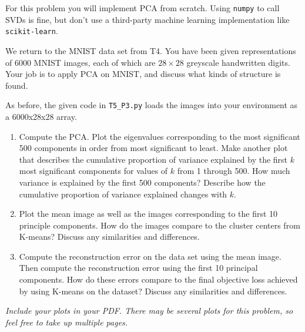 \documentclass[submit]{harvardml}
\begin{document}
\newpage

\begin{problem}

For this problem you will implement PCA from scratch.  Using
\texttt{numpy} to call SVDs is fine, but don't use a third-party
machine learning implementation like \texttt{scikit-learn}.

We return to the MNIST data set from T4. You have been given
representations of 6000 MNIST images, each of which are $28\times28$
greyscale handwritten digits. Your job is to apply PCA on MNIST, and
discuss what kinds of structure is found.

As before, the given code in \texttt{T5\_P3.py} loads the images into your environment as a
6000x28x28 array.

\begin{enumerate}

\item Compute the PCA. Plot the eigenvalues corresponding to the most significant 500
  components in order from most significant to least. Make another plot that describes the cumulative proportion of variance explained by the first $k$ most significant components for values of $k$ from 1 through 500.
  How much variance is explained by the first 500 components?  Describe
  how the cumulative proportion of variance explained changes with $k$.

\item Plot the mean image as well as the images corresponding to the
  first 10 principle components.  How do the images compare to the
  cluster centers from K-means? Discuss any similarities and
  differences.

\item Compute the reconstruction error on the data set using the mean
  image. Then compute the reconstruction error using the first 10 principal components. How do these
  errors compare to the final objective loss achieved by using K-means on the dataset? Discuss any similarities and
  differences.

\end{enumerate}


\textit{Include your plots in your PDF. There may be several plots for this problem, so feel free
to take up multiple pages.}






\end{problem}
\end{document}
